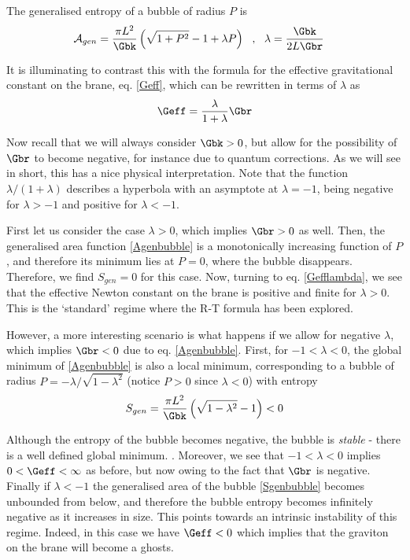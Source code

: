The generalised entropy of a bubble of radius $P$ is
\begin{align}\label{Agenbubble}
\mathcal{A}_{gen}&=\frac{\pi L^2}{\Gbk} \left(  \sqrt{1+P^2}-1  + \lambda P \right)\ \ ,\ \ \lambda=\frac{\Gbk}{2L \Gbr}
\end{align}

It is illuminating to contrast this with the formula for the effective gravitational constant on the brane, eq. \eqref{Geff}, which can be rewritten in terms of $\lambda$ as
\begin{align}\label{Gefflambda}
\Geff=\frac{\lambda}{1+\lambda}\Gbr
\end{align}

Now recall that we will always consider $\Gbk>0$, but allow for the possibility of $\Gbr$ to become negative, for instance due to quantum corrections. As we will see in short, this has a nice physical interpretation. Note that the function $\lambda/(1+\lambda)$ describes a hyperbola with an asymptote at $\lambda=-1$, being negative for $\lambda>-1$ and positive for $\lambda<-1$.

First let us consider the case $\lambda>0$, which implies $\Gbr>0$ as well. Then, the generalised area function \eqref{Agenbubble} is a monotonically increasing function of $P$, and therefore its minimum lies at $P=0$, where the bubble disappears. Therefore, we find $S_{gen}=0$ for this case. Now, turning to eq. \eqref{Gefflambda}, we see that the effective Newton constant on the brane is positive and finite for $\lambda>0$. This is the `standard' regime where the R-T formula has been explored. 

However, a more interesting scenario is what happens if we allow for negative $\lambda$, which implies $\Gbr<0$ due to eq. \eqref{Agenbubble}. First, for $-1<\lambda<0$, the global minimum of \eqref{Agenbubble} is also a local minimum, corresponding to a bubble of radius $P=-\lambda/\sqrt{1-\lambda^2}$ (notice $P>0$ since $\lambda<0$) with entropy 
\begin{align}\label{Sgenbubble}
S_{gen}= \frac{\pi L^2}{\Gbk} \left( \sqrt{1-\lambda^2} - 1 \right)<0
\end{align}

Although the entropy of the bubble becomes negative, the bubble is \textit{stable} - there is a well defined global minimum. . Moreover, we see that $-1<\lambda<0$ implies $0<\Geff<\infty$ as before, but now owing to the fact that $\Gbr$ is negative. Finally if $\lambda<-1$ the generalised area of the bubble \eqref{Sgenbubble} becomes unbounded from below, and therefore the bubble entropy becomes infinitely negative as it increases in size. This points towards an intrinsic instability of this regime. Indeed, in this case we have $\Geff<0$ which implies that the graviton on the brane will become a ghosts.

